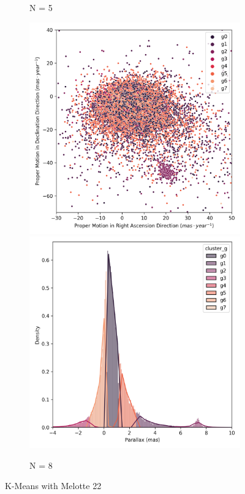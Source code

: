 \documentclass[preprint,12pt,authoryear]{elsarticle}
\begin{document}
\begin{figure}[!htbp]
\begin{subfigure}[b]{0.3\textwidth}
      \caption{N = 5}
  \end{subfigure}
  \medskip
  \begin{subfigure}[b]{0.3\textwidth}
    \centering
      \includegraphics[width=\textwidth]{../figures/kmeans/kmeans_n8_pm_melotte_22.png}
      \includegraphics[width=\textwidth]{../figures/kmeans/kmeans_n8_parallax_melotte_22.png}
      \caption{N = 8}
  \end{subfigure}
  \caption{K-Means with Melotte 22}
  \label{fig:kmeans_comparisons_melotte_22}
\end{figure}
\end{document}
